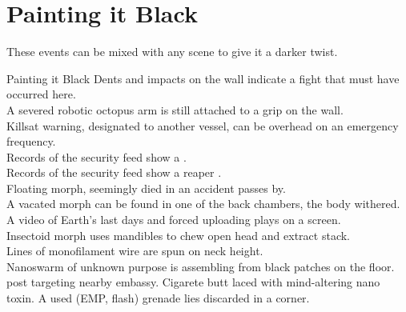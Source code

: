 
\section*{Painting it Black}

These events can be mixed with any scene to give it a darker twist.

\begin{tableone}{Painting it Black}
Dents and impacts on the wall indicate a fight that must have occurred here.\\
A severed robotic octopus arm is still attached to a grip on the wall.\\
Killsat warning, designated to another vessel, can be overhead on an emergency frequency.\\
Records of the security feed show a  .\\
Records of the security feed show a reaper .\\
Floating morph, seemingly died in an accident passes by.\\
A vacated morph can be found in one of the back chambers, the body withered.\\
A video of Earth's last days and forced uploading plays on a screen.\\
Insectoid morph uses mandibles to chew open head and extract stack.\\
Lines of monofilament wire are spun on neck height.\\
Nanoswarm of unknown purpose is assembling from black patches on the floor.\\
 post targeting nearby embassy.
Cigarete butt laced with mind-altering nano toxin.
A used (EMP, flash) grenade lies discarded in a corner.\\
\end{tableone}

